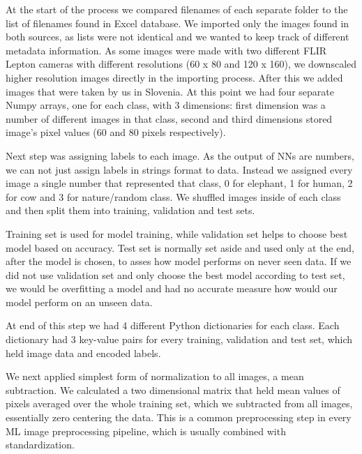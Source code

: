 At the start of the process we compared filenames of each separate folder to the list of filenames found in Excel database.
We imported only the images found in both sources, as lists were not identical and we wanted to keep track of different metadata information.
As some images were made with two different FLIR Lepton cameras with different resolutions (60 x 80 and 120 x 160), we downscaled higher resolution images directly in the importing process.
After this we added images that were taken by us in Slovenia.
At this point we had four separate Numpy arrays, one for each class, with 3 dimensions: first dimension was a number of different images in that class, second and third dimensions stored image's pixel values (60 and 80 pixels respectively).

Next step was assigning labels to each image.
As the output of NNs are numbers, we can not just assign labels in strings format to data.
Instead we assigned every image a single number that represented that class, 0 for elephant, 1 for human, 2 for cow and 3 for nature/random class.
We shuffled images inside of each class and then split them into training, validation and test sets.

Training set is used for model training, while validation set helps to choose best model based on accuracy.
Test set is normally set aside and used only at the end, after the model is chosen, to asses how model performs on never seen data.
If we did not use validation set and only choose the best model according to test set, we would be overfitting a model and had no accurate measure how would our model perform on an unseen data.

At end of this step we had 4 different Python dictionaries for each class.
Each dictionary had 3 key-value pairs for every training, validation and test set, which held image data and encoded labels.

We next applied simplest form of normalization to all images, a mean subtraction.
We calculated a two dimensional matrix that held mean values of pixels averaged over the whole training set, which we subtracted from all images, essentially zero centering the data.
This is a common preprocessing step in every ML image preprocessing pipeline, which is usually combined with standardization\footnotemark.


